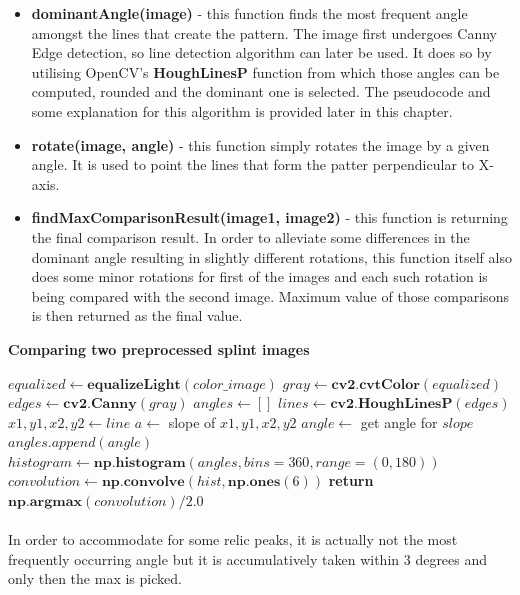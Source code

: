 \begin{itemize}
	\item \textbf{dominantAngle(image)} - this function finds the most frequent angle amongst the lines that create the pattern. The image first undergoes Canny Edge detection, so line detection algorithm can later be used. It does so by utilising OpenCV's \textbf{HoughLinesP} function from which those angles can be computed, rounded and the dominant one is selected. The pseudocode and some explanation for this algorithm is provided later in this chapter.
	\item \textbf{rotate(image, angle)} - this function simply rotates the image by a given angle. It is used to point the lines that form the patter perpendicular to X-axis.
	\item \textbf{findMaxComparisonResult(image1, image2)} - this function is returning the final comparison result. In order to alleviate some differences in the dominant angle resulting in slightly different rotations, this function itself also does some minor rotations for first of the images and each such rotation is being compared with the second image. Maximum value of those comparisons is then returned as the final value.
\end{itemize}

\begin{algorithm}{\textbf{Comparing two preprocessed splint images}}
	\begin{spacing}{1.5}
	\begin{algorithmic}[1]
			\State $equalized \gets \textbf{equalizeLight}(color\_image)$
			\State $gray \gets \textbf{cv2.cvtColor}(equalized)$
			\State $edges \gets \textbf{cv2.Canny}(gray)$
			\State $angles \gets []$
			\State $lines \gets \textbf{cv2.HoughLinesP}(edges)$
				\State $x1, y1, x2, y2 \gets line$
				\State $a \gets $ slope of $x1, y1, x2, y2$
				\State $angle \gets$ get angle for $slope$
				\State $angles.append(angle)$
			\EndFor
			\State $histogram \gets \textbf{np.histogram}(angles, bins=360, range=(0, 180))$
			\State $convolution \gets \textbf{np.convolve}(hist, \textbf{np.ones}(6))$
			\State \textbf{return} $\textbf{np.argmax}(convolution) / 2.0$
		\EndFunction
	\end{algorithmic}
	\end{spacing}
\end{algorithm}

\paragraph{}
In order to accommodate for some relic peaks, it is actually not the most frequently occurring angle but it is accumulatively taken within 3 degrees and only then the max is picked.

